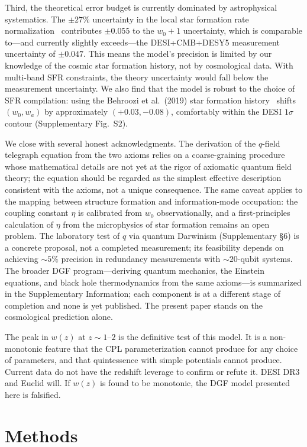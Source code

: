 \documentclass[12pt,a4paper]{article}
\begin{document}
Third, the theoretical error budget is currently dominated by astrophysical systematics. The $\pm27\%$ uncertainty in the local star formation rate normalization~\cite{madau2014} contributes $\pm0.055$ to the $w_0+1$ uncertainty, which is comparable to---and currently slightly exceeds---the DESI+CMB+DESY5 measurement uncertainty of $\pm0.047$. This means the model's precision is limited by our knowledge of the cosmic star formation history, not by cosmological data. With multi-band SFR constraints, the theory uncertainty would fall below the measurement uncertainty. We also find that the model is robust to the choice of SFR compilation: using the Behroozi et al.\ (2019) star formation history~\cite{behroozi2019} shifts $(w_0,w_a)$ by approximately $(+0.03,-0.08)$, comfortably within the DESI $1\sigma$ contour (Supplementary Fig.~S2).

We close with several honest acknowledgments. The derivation of the $q$-field telegraph equation from the two axioms relies on a coarse-graining procedure whose mathematical details are not yet at the rigor of axiomatic quantum field theory; the equation should be regarded as the simplest effective description consistent with the axioms, not a unique consequence. The same caveat applies to the mapping between structure formation and information-mode occupation: the coupling constant $\eta$ is calibrated from $w_0$ observationally, and a first-principles calculation of $\eta$ from the microphysics of star formation remains an open problem. The laboratory test of $q$ via quantum Darwinism (Supplementary \S6) is a concrete proposal, not a completed measurement; its feasibility depends on achieving $\sim5\%$ precision in redundancy measurements with $\sim20$-qubit systems. The broader DGF program---deriving quantum mechanics, the Einstein equations, and black hole thermodynamics from the same axioms---is summarized in the Supplementary Information; each component is at a different stage of completion and none is yet published. The present paper stands on the cosmological prediction alone.

The peak in $w(z)$ at $z\sim1$--$2$ is the definitive test of this model. It is a non-monotonic feature that the CPL parameterization cannot produce for any choice of parameters, and that quintessence with simple potentials cannot produce. Current data do not have the redshift leverage to confirm or refute it. DESI DR3 and Euclid will. If $w(z)$ is found to be monotonic, the DGF model presented here is falsified.

\section*{Methods}
\end{document}
